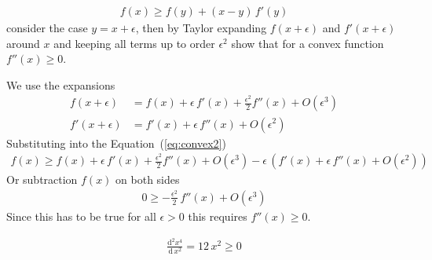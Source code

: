 \documentclass{sotonExamBoxes}    %
\newcommand{\bra}[1]{\left(#1\right)}
\newcommand{\dd}{\mathrm{d}}
\begin{document}
\begin{question}{10}
\begin{qparts}
{        \begin{align}\label{eq:convex2}
          f(x) \geq f(y)  + (x-y)\, f'(y)
        \end{align}
        consider the case $y = x+\epsilon$, then by Taylor expanding $f(x+\epsilon)$
        and $f'(x+\epsilon)$ around $x$ and keeping all terms up to
        order $\epsilon^2$ show that for a convex function $f''(x)\geq0$.
      }{}
      \begin{answer}
        We use the expansions
        \begin{align*}
          f(x+\epsilon) &= f(x) + \epsilon\,f'(x) +
                          \frac{\epsilon^2}{2} f''(x) + O(\epsilon^3) \\
          f'(x+\epsilon) &= f'(x) + \epsilon\,f''(x) +
                           O(\epsilon^2) 
        \end{align*}
        Substituting into the Equation~(\ref{eq:convex2})
        \begin{align*}
          f(x) \geq f(x) + \epsilon\,f'(x) +
          \frac{\epsilon^2}{2} f''(x) + O(\epsilon^3)
          - \epsilon\,\bra{f'(x) + \epsilon\,f''(x) +
                           O(\epsilon^2) }
        \end{align*}
        Or subtraction $f(x)$ on both sides
        \begin{align*}
          0 \geq - \frac{\epsilon^2}{2} \, f''(x) + O(\epsilon^3)
        \end{align*}
        Since this has to be true for all $\epsilon>0$ this requires $f''(x)\geq0$.
      \end{answer}
      \begin{answer}
        \begin{align*}
          \frac{\dd^2 x^4}{\dd \, x^2} = 12\,x^2 \geq 0
        \end{align*}
      \end{answer}
  \end{qparts}
\end{question}
\freshpage

\end{document}
